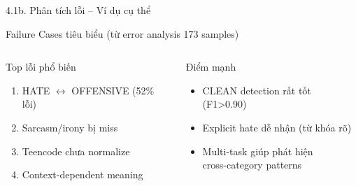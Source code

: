 \documentclass[11pt, aspectratio=169]{beamer}
\begin{document}
\begin{frame}[fragile, shrink=15]{4.1b. Phân tích lỗi -- Ví dụ cụ thể}

\begin{block}{Failure Cases tiêu biểu (từ error analysis 173 samples)}
  \centering
\end{block}

\vspace{0.2cm}
\begin{columns}[T]
  \begin{block}{Top lỗi phổ biến}
    \begin{enumerate}
      \item HATE $\leftrightarrow$ OFFENSIVE (52\% lỗi)
      \item Sarcasm/irony bị miss
      \item Teencode chưa normalize
      \item Context-dependent meaning
    \end{enumerate}
  \end{block}

  \begin{block}{Điểm mạnh}
    \begin{itemize}
      \item CLEAN detection rất tốt (F1>0.90)
      \item Explicit hate dễ nhận (từ khóa rõ)
      \item Multi-task giúp phát hiện\\cross-category patterns
    \end{itemize}
  \end{block}
\end{columns}
\end{frame}
\end{document}
